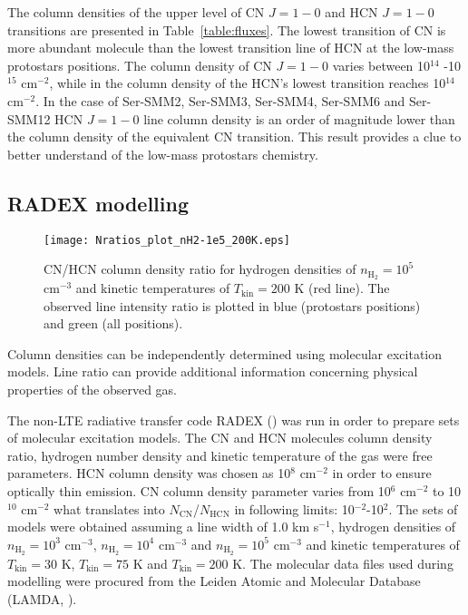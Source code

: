 \documentclass{aa}
\begin{document}
The column densities of the upper level of CN $J=1-0$ and HCN $J=1-0$ transitions are presented in Table~\ref{table:fluxes}. The lowest transition of CN is more abundant molecule than the lowest transition line of HCN at the low-mass protostars positions. The column density of CN $J=1-0$ varies between 10$^{14}$ -10$^{15}$ cm$^{-2}$, while in the column density of the HCN’s lowest transition reaches 10$^{14}$ cm$^{-2}$. In the case of Ser-SMM2, Ser-SMM3, Ser-SMM4, Ser-SMM6 and Ser-SMM12 HCN $J=1-0$ line column density is an order of magnitude lower than the column density of the equivalent CN transition. This result provides a clue to better understand of the low-mass protostars chemistry. 

\subsection{RADEX modelling}

\begin{figure}
   \centering
   \texttt{[image: Nratios\_plot\_nH2-1e5\_200K.eps]}
      \caption{CN/HCN column density ratio for hydrogen densities of $n_\mathrm{H_2} = 10^5$ cm$^{-3}$ and kinetic temperatures of $T_\mathrm{kin} = 200$ K (red line). The observed line intensity ratio is plotted in blue (protostars positions) and green (all positions).}
         \label{1e5_75K}
\end{figure}

Column densities can be independently determined using molecular excitation models. Line ratio can provide additional information concerning physical properties of the observed gas. 

The non-LTE radiative transfer code RADEX (\citealt{vdT07}) was run in order to prepare sets of molecular excitation models. The CN and HCN molecules column density ratio, hydrogen number density and kinetic temperature of the gas were free parameters. HCN column density was chosen as 10$^8$ cm$^{-2}$ in order to ensure optically thin emission. CN column density parameter varies from 10$^6$ cm$^{-2}$ to 10$^{10}$ cm$^{-2}$ what translates into $N_\mathrm{CN}$/$N_\mathrm{HCN}$ in following limits: 10$^{-2}$-10$^{2}$. The sets of models were obtained assuming a line width of 1.0 km s$^{-1}$, hydrogen densities of $n_\mathrm{H_2} = 10^3$ cm$^{-3}$, $n_\mathrm{H_2} = 10^4$ cm$^{-3}$ and $n_\mathrm{H_2} = 10^5$ cm$^{-3}$ and kinetic temperatures of $T_\mathrm{kin} = 30$ K, $T_\mathrm{kin} = 75$ K and $T_\mathrm{kin} =200$ K. The molecular data files used during modelling were procured from the Leiden Atomic and Molecular Database (LAMDA, \citealt{Sch05}).
\end{document}
